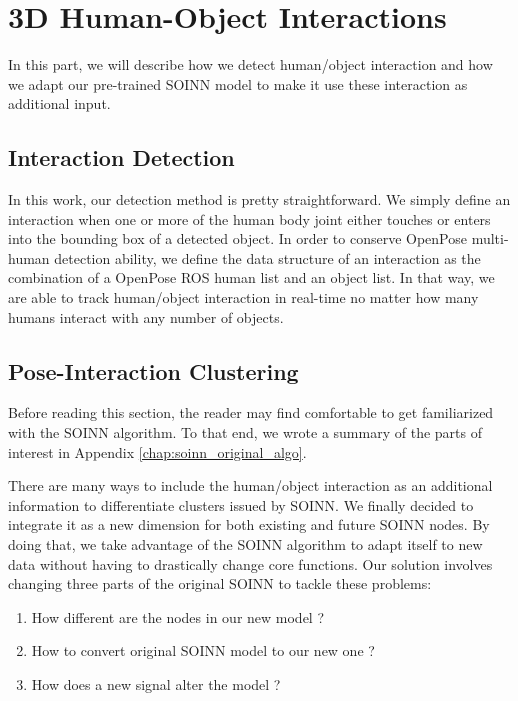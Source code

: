 \section{3D Human-Object Interactions}
In this part, we will describe how we detect human/object interaction and how we adapt our pre-trained SOINN model to make it use these interaction as additional input.

\subsection{Interaction Detection}
In this work, our detection method is pretty straightforward. We simply define an interaction when one or more of the human body joint either touches or enters into the bounding box of a detected object. In order to conserve OpenPose multi-human detection ability, we define the data structure of an interaction as the combination of a OpenPose ROS human list and an object list. In that way, we are able to track human/object interaction in real-time no matter how many humans interact with any number of objects.

\subsection{Pose-Interaction Clustering}
\label{section:pose-interaction_clustering}
Before reading this section, the reader may find comfortable to get familiarized with the SOINN algorithm. To that end, we wrote a summary of the parts of interest in Appendix \ref{chap:soinn_original_algo}.


There are many ways to include the human/object interaction as an additional information to differentiate clusters issued by SOINN. We finally decided to integrate it as a new dimension for both existing and future SOINN nodes. By doing that, we take advantage of the SOINN algorithm to adapt itself to new data without having to drastically change core functions. Our solution involves changing three parts of the original SOINN to tackle these problems:

\begin{enumerate}
    \item{How different are the nodes in our new model ?}
    \item{How to convert original SOINN model to our new one ?}
    \item{How does a new signal alter the model ?}
\end{enumerate}

